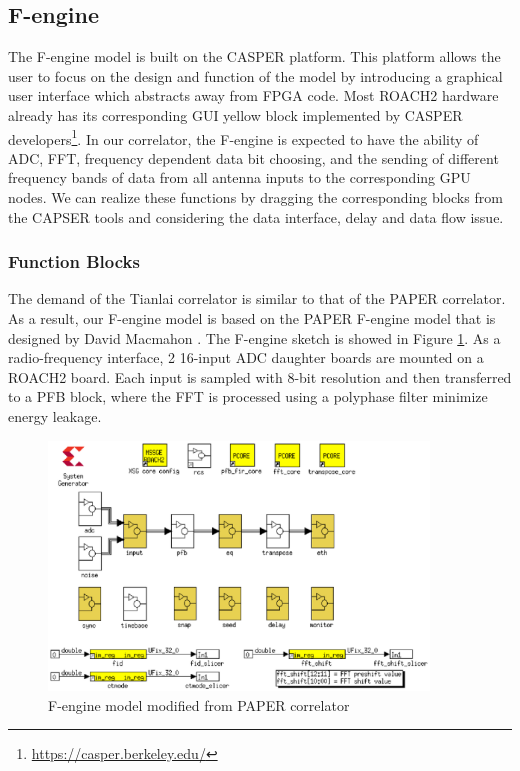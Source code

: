 \documentclass{ws-jai}
\begin{document}
\subsection{F-engine}\label{sec:F-engine}
	The F-engine model is built on the CASPER platform. This platform allows the user to focus on the design and function of the model by introducing a graphical user interface which abstracts away from FPGA code. Most ROACH2 hardware already has its corresponding GUI yellow block implemented by CASPER developers\footnote{\url{https://casper.berkeley.edu/}}. In our correlator, the F-engine is expected to have the ability of ADC, FFT, frequency dependent data bit choosing, and the sending of different frequency bands of data from all antenna inputs to the corresponding GPU nodes. We can realize these functions by dragging the corresponding blocks from the CAPSER tools and considering the data interface, delay and data flow issue.

\subsubsection{Function Blocks\label{sec:function model}}
	The demand of the Tianlai correlator is similar to that of the PAPER correlator. As a result, our F-engine model is based on the PAPER F-engine model that is designed by David Macmahon \citep{paper_correlator}. The F-engine sketch is showed in Figure \ref{fig:f-engine}. As a radio-frequency interface, 2 16-input ADC daughter boards are mounted on a ROACH2 board. Each input is sampled with 8-bit resolution and then transferred to a PFB block, where the FFT is processed using a polyphase filter minimize energy leakage. 
	
\begin{figure}[t]
 \centering
 \includegraphics[width=0.9\textwidth]{./picture/f-engine1.eps}
\caption{F-engine model modified from PAPER correlator\label{fig:f-engine}}
\end{figure}
\end{document}
